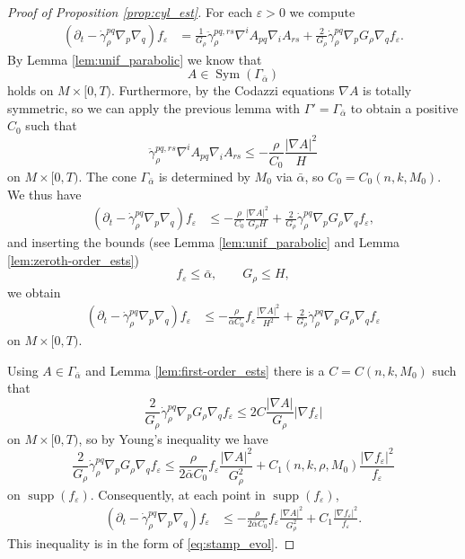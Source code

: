 \documentclass[12pt]{amsart}
\DeclareMathOperator{\sym}{Sym}
\DeclareMathOperator{\supp}{supp}
\begin{document}
\begin{proof}[Proof of Proposition \ref{prop:cyl_est}]
For each $\varepsilon >0$ we compute
\begin{align*}
(\partial_t - \dot \gamma_{\rho}^{pq} \nabla_p \nabla_q) f_\varepsilon &=  \frac{1}{G_\rho} \ddot \gamma_\rho^{pq,rs}\nabla^i A_{pq} \nabla_i A_{rs} + \frac{2}{G_\rho} \dot \gamma_\rho^{pq} \nabla_p G_\rho \nabla_q f_\varepsilon.
\end{align*}
By Lemma \ref{lem:unif_parabolic} we know that 
\[A \in \sym(\Gamma_{\bar \alpha})\]
holds on $M\times [0,T)$. Furthermore, by the Codazzi equations $\nabla A$ is totally symmetric, so we can apply the previous lemma with $\Gamma' = \Gamma_{\bar \alpha}$ to obtain a positive $C_0$ such that
\[\ddot \gamma_\rho^{pq,rs}\nabla^i A_{pq} \nabla_i A_{rs} \leq - \frac{\rho}{C_0} \frac{|\nabla A|^2}{H}\]
on $M\times [0,T)$. The cone $\Gamma_{\bar \alpha}$ is determined by $M_0$ via $\bar \alpha$, so $C_0 = C_0(n,k, M_0)$. We thus have 
\begin{align*}
(\partial_t - \dot \gamma_{\rho}^{pq} \nabla_p \nabla_q) f_\varepsilon &\leq  -\frac{\rho}{C_0} \frac{|\nabla A|^2}{G_\rho H}  + \frac{2}{G_\rho} \dot \gamma_\rho^{pq} \nabla_p G_\rho \nabla_q f_\varepsilon,
\end{align*}
and inserting the bounds (see Lemma \ref{lem:unif_parabolic} and Lemma \ref{lem:zeroth-order_ests})
\[f_\varepsilon \leq \bar \alpha, \qquad G_\rho \leq H,\]
we obtain
\begin{align*}
(\partial_t - \dot \gamma_{\rho}^{pq} \nabla_p \nabla_q) f_\varepsilon &\leq  -\frac{\rho}{\bar \alpha C_0} f_\varepsilon\frac{|\nabla A|^2}{H^2}  + \frac{2}{G_\rho} \dot \gamma_\rho^{pq} \nabla_p G_\rho \nabla_q f_\varepsilon
\end{align*}
on $M\times [0,T)$. 

Using $A \in \Gamma_{\bar \alpha}$ and Lemma \ref{lem:first-order_ests} there is a $C = C(n,k,M_0)$ such that 
\[\frac{2}{G_\rho} \dot \gamma_\rho^{pq} \nabla_p G_\rho \nabla_q f_\varepsilon \leq 2C \frac{|\nabla A|}{G_\rho} |\nabla f_\varepsilon|\]
on $M\times [0,T)$, so by Young's inequality we have 
\[\frac{2}{G_\rho} \dot \gamma_\rho^{pq} \nabla_p G_\rho \nabla_q f_\varepsilon \leq \frac{\rho}{2 \bar \alpha C_0} f_\varepsilon \frac{|\nabla A|^2}{G_\rho^2} + C_1(n,k,\rho, M_0)  \frac{|\nabla f_\varepsilon|^2}{f_\varepsilon}\]
on $\supp(f_\varepsilon)$. Consequently, at each point in $\supp(f_\varepsilon)$,
\begin{align*}
(\partial_t - \dot \gamma_{\rho}^{pq} \nabla_p \nabla_q) f_\varepsilon &\leq  -\frac{\rho}{2\bar \alpha C_0} f_\varepsilon\frac{|\nabla A|^2}{G_\rho^2}  + C_1  \frac{|\nabla f_\varepsilon|^2}{f_\varepsilon}.
\end{align*}
This inequality is in the form of \eqref{eq:stamp_evol}.


\end{proof}
\end{document}
